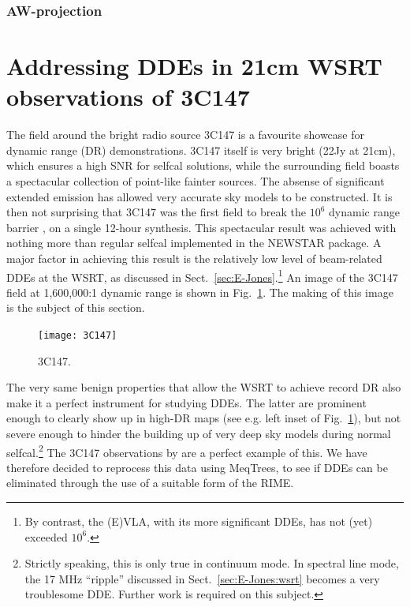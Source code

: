 \documentclass[]{aa}
\begin{document}
\subsubsection{AW-projection\label{sec:awproj}}



\section{Addressing DDEs in 21cm WSRT observations of \label{sec:3C147}3C147}

The field around the bright radio source 3C147 is a favourite showcase for dynamic range (DR) demonstrations. 3C147 itself is very bright (22Jy at 21cm), which ensures a high SNR for selfcal solutions, while the surrounding field boasts a spectacular collection of point-like fainter sources. The absense of significant extended emission has allowed very accurate sky models to be constructed. It is then not surprising that 3C147 was the first field to break the $10^6$ dynamic range barrier \citep{deBruyn:million,deBruyn:3C147}, on a single 12-hour synthesis. This spectacular result was achieved with nothing more than regular selfcal implemented in the NEWSTAR package. A major factor in achieving this result is the relatively low level of beam-related DDEs at the WSRT, as discussed in 
Sect.~\ref{sec:E-Jones}.\footnote{By contrast, the (E)VLA, with its more significant DDEs, has not (yet) exceeded $10^6$.} An image of the 3C147 field at 1,600,000:1 dynamic range is shown in Fig.~\ref{fig:3C147}. The making of this image is the subject of this section. 

\begin{figure}
\begin{centering}\texttt{[image: 3C147]}\par\end{centering}
\caption{\label{fig:3C147}3C147.}
\end{figure}


The very same benign properties that allow the WSRT to achieve record DR also make it a perfect instrument for studying DDEs. The latter are prominent enough to clearly show up in high-DR maps (see e.g. left inset of Fig.~\ref{fig:3C147}), but not severe enough to hinder the building up of very deep sky models during normal selfcal.\footnote{Strictly speaking, this is only true in continuum mode. In spectral line mode, the 17 MHz ``ripple'' discussed in Sect.~\ref{sec:E-Jones:wsrt} becomes a very troublesome DDE. Further work is required on this subject.} The 3C147 observations by \citet{deBruyn:3C147} are a perfect example of this. We have therefore decided to reprocess this data using MeqTrees, to see if DDEs can be eliminated through the use of a suitable form of the RIME.
\end{document}
